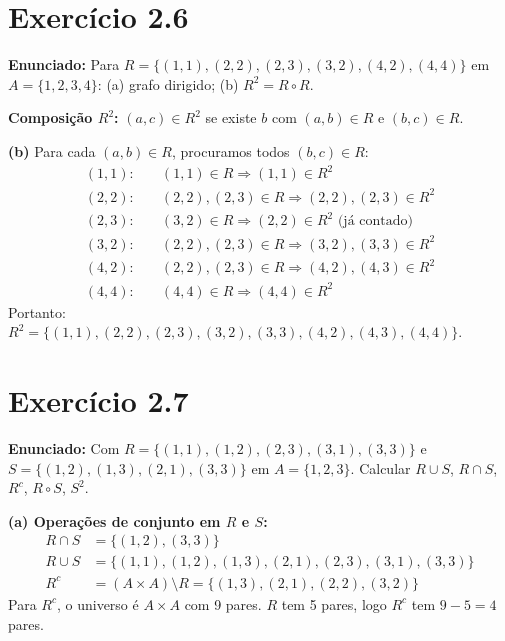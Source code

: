 \documentclass[12pt,a4paper]{article}
\begin{document}
\section*{Exercício 2.6}

\textbf{Enunciado:} Para $R = \{(1,1),(2,2),(2,3),(3,2),(4,2),(4,4)\}$ em $A = \{1,2,3,4\}$: (a) grafo dirigido; (b) $R^2 = R \circ R$.

\begin{teoribox}
\textbf{Composição $R^2$:} $(a,c) \in R^2$ se existe $b$ com $(a,b) \in R$ e $(b,c) \in R$.
\end{teoribox}

\textbf{(b)} Para cada $(a,b) \in R$, procuramos todos $(b,c) \in R$:
\begin{align*}
(1,1): &\quad (1,1) \in R \Rightarrow (1,1) \in R^2 \\
(2,2): &\quad (2,2),(2,3) \in R \Rightarrow (2,2),(2,3) \in R^2 \\
(2,3): &\quad (3,2) \in R \Rightarrow (2,2) \in R^2 \text{ (já contado)} \\
(3,2): &\quad (2,2),(2,3) \in R \Rightarrow (3,2),(3,3) \in R^2 \\
(4,2): &\quad (2,2),(2,3) \in R \Rightarrow (4,2),(4,3) \in R^2 \\
(4,4): &\quad (4,4) \in R \Rightarrow (4,4) \in R^2
\end{align*}
Portanto: $R^2 = \{(1,1),(2,2),(2,3),(3,2),(3,3),(4,2),(4,3),(4,4)\}$.

\section*{Exercício 2.7}

\textbf{Enunciado:} Com $R = \{(1,1),(1,2),(2,3),(3,1),(3,3)\}$ e $S = \{(1,2),(1,3),(2,1),(3,3)\}$ em $A = \{1,2,3\}$. Calcular $R \cup S$, $R \cap S$, $R^c$, $R \circ S$, $S^2$.

\textbf{(a) Operações de conjunto em $R$ e $S$:}
\begin{align*}
R \cap S &= \{(1,2),(3,3)\} \\
R \cup S &= \{(1,1),(1,2),(1,3),(2,1),(2,3),(3,1),(3,3)\} \\
R^c &= (A \times A) \setminus R = \{(1,3),(2,1),(2,2),(3,2)\}
\end{align*}
Para $R^c$, o universo é $A \times A$ com 9 pares. $R$ tem 5 pares, logo $R^c$ tem $9 - 5 = 4$ pares.
\end{document}

